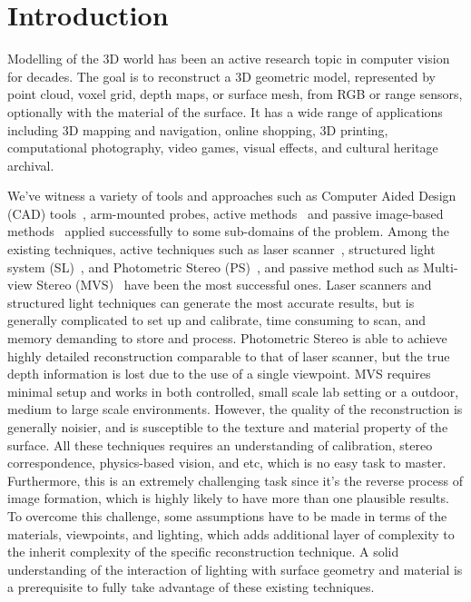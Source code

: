 
\chapter{Introduction}
\label{ch:Introduction}
Modelling of the 3D world has been an active research topic in computer vision for decades. The goal is to reconstruct a 3D geometric model, represented by point cloud, voxel grid, depth maps, or surface mesh, from RGB or range sensors, optionally with the material of the surface. It has a wide range of applications including 3D mapping and navigation, online shopping, 3D printing, computational photography, video games, visual effects, and cultural heritage archival.

We've witness a variety of tools and approaches such as Computer Aided Design (CAD) tools~\cite{CAD}, arm-mounted probes, active methods~\cite{bernardini2002building,levoy2000digital,Lidar,kinect} and passive image-based methods~\cite{kutulakos2000theory,furukawa2010accurate,faugeras2002variational,goesele2006multi} applied successfully to some sub-domains of the problem. Among the existing techniques, active techniques such as laser scanner~\cite{levoy2000digital}, structured light system (SL)~\cite{bernardini2002building}, and Photometric Stereo (PS)~\cite{woodham1980photometric}, and passive method such as Multi-view Stereo (MVS)~\cite{seitz2006comparison} have been the most successful ones. Laser scanners and structured light techniques can generate the most accurate results, but is generally complicated to set up and calibrate, time consuming to scan, and memory demanding to store and process. Photometric Stereo is able to achieve highly detailed reconstruction comparable to that of laser scanner, but the true depth information is lost due to the use of a single viewpoint. MVS requires minimal setup and works in both controlled, small scale lab setting or a outdoor, medium to large scale environments. However, the quality of the reconstruction is generally noisier, and is susceptible to the texture and material property of the surface. All these techniques requires an understanding of calibration, stereo correspondence, physics-based vision, and etc, which is no easy task to master. Furthermore, this is an extremely challenging task since it's the reverse process of image formation, which is highly likely to have more than one plausible results. To overcome this challenge, some assumptions have to be made in terms of the materials, viewpoints, and lighting, which adds additional layer of complexity to the inherit complexity of the specific reconstruction technique. A solid understanding of the interaction of lighting with surface geometry and material is a prerequisite to fully take advantage of these existing techniques.

